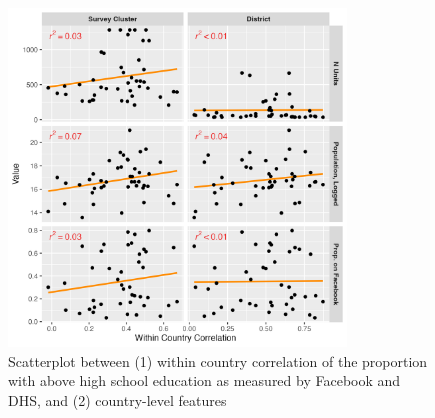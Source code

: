 \documentclass{article}
\begin{document}
\begin{figure}[H]
    \centering
    \includegraphics[width=0.8\textwidth]{figures/educ_fb_dhs_explain.png}
    \caption{Scatterplot between (1) within country correlation of the proportion with above high school education as measured by Facebook and DHS, and (2) country-level features}
     \label{fig:educ_fb_dhs_explain}
\end{figure}
\end{document}
